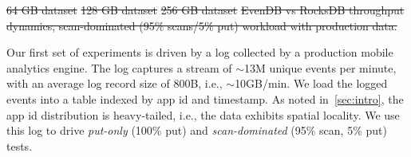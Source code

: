 \documentclass[sigplan,10pt]{acmart}
\newcommand{\sys}{EvenDB}
\providecommand{\DIFdel}[1]{{\protect\color{red}\sout{#1}}}                      %
\providecommand{\DIFdelbegin}{} %
\providecommand{\DIFdelend}{} %
\providecommand{\DIFdelFL}[1]{\DIFdel{#1}} %
\begin{document}
\DIFdelbegin %
{%
\DIFdelFL{64 GB dataset}}
\DIFdelFL{\hspace{0.03\linewidth} 
}%
{%
\DIFdelFL{128 GB dataset}}
\DIFdelFL{\hspace{0.03\linewidth} 
}%
{%
\DIFdelFL{256 GB dataset}}
{%
\DIFdelFL{\sys\/ vs RocksDB throughput dynamics,  scan-dominated (95\% scans/5\% put) workload with production data.}}

\DIFdelend Our first set of experiments is driven by a log collected by a production mobile analytics engine. The log captures 
a stream  of $\sim$13M unique events per minute, with an average log record size of 800B, i.e., $\sim$10GB/min. 
We load the logged events into a table indexed by app id and timestamp. 
As noted in~\cref{sec:intro}, the app id distribution is heavy-tailed, i.e., the data exhibits spatial locality. 
We use this log to drive \emph{put-only} (100\% put) and \emph{scan-dominated} 
(95\% scan, 5\% put) tests.
\end{document}
